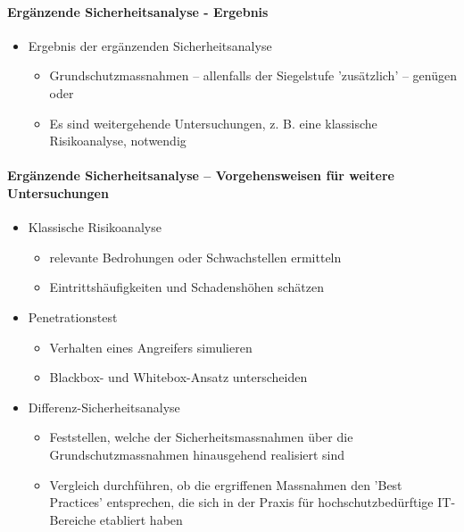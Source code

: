 \documentclass[10pt,a4paper]{article}
\begin{document}
\paragraph*{Ergänzende Sicherheitsanalyse - Ergebnis}
\begin{itemize}[noitemsep,topsep=0pt,leftmargin=*]
    \item Ergebnis der ergänzenden Sicherheitsanalyse
    \begin{itemize}[noitemsep,topsep=0pt,leftmargin=*]
        \item Grundschutzmassnahmen – allenfalls der Siegelstufe
        'zusätzlich' – genügen
        oder
        \item Es sind weitergehende Untersuchungen, z. B. eine
        klassische Risikoanalyse, notwendig
    \end{itemize}
\end{itemize}

\paragraph*{Ergänzende Sicherheitsanalyse – Vorgehensweisen für weitere Untersuchungen}
\begin{itemize}[noitemsep,topsep=0pt,leftmargin=*]
    \item Klassische Risikoanalyse
    \begin{itemize}[noitemsep,topsep=0pt,leftmargin=*]
        \item relevante Bedrohungen oder Schwachstellen ermitteln
        \item Eintrittshäufigkeiten und Schadenshöhen schätzen
    \end{itemize}
    \item Penetrationstest
    \begin{itemize}[noitemsep,topsep=0pt,leftmargin=*]
        \item Verhalten eines Angreifers simulieren
        \item Blackbox- und Whitebox-Ansatz unterscheiden
    \end{itemize}
    \item Differenz-Sicherheitsanalyse
    \begin{itemize}[noitemsep,topsep=0pt,leftmargin=*]
        \item Feststellen, welche der Sicherheitsmassnahmen über die
        Grundschutzmassnahmen hinausgehend realisiert sind
        \item Vergleich durchführen, ob die ergriffenen Massnahmen den
        'Best Practices' entsprechen, die sich in der Praxis für
        hochschutzbedürftige IT-Bereiche etabliert haben
    \end{itemize}
\end{itemize}
\end{document}
